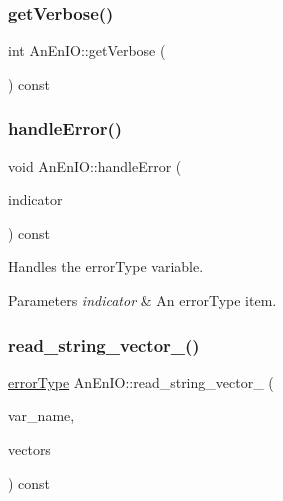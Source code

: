 \mbox{\label{class_an_en_i_o_a0bf0dab5e393c5597f97ab38c910e24d}} 
\subsubsection{\texorpdfstring{get\+Verbose()}{getVerbose()}}
{\footnotesize\ttfamily int An\+En\+I\+O\+::get\+Verbose (\begin{DoxyParamCaption}{ }\end{DoxyParamCaption}) const}

\mbox{\label{class_an_en_i_o_a92276aeba9c0b5bd1cd3d285271d505f}} 
\subsubsection{\texorpdfstring{handle\+Error()}{handleError()}}
{\footnotesize\ttfamily void An\+En\+I\+O\+::handle\+Error (\begin{DoxyParamCaption}\item[{const \mbox{\hyperlink{class_an_en_i_o_aa56bc1ec6610b86db4349bce20f9ead0}{error\+Type}} \&}]{indicator }\end{DoxyParamCaption}) const}

Handles the error\+Type variable.


\begin{DoxyParams}{Parameters}
{\em indicator} & An error\+Type item. \\
\hline
\end{DoxyParams}
\mbox{\label{class_an_en_i_o_a17e7a4c520675c23b01cbd65c7ffe1d5}} 
\subsubsection{\texorpdfstring{read\+\_\+string\+\_\+vector\+\_\+()}{read\_string\_vector\_()}}
{\footnotesize\ttfamily \mbox{\hyperlink{class_an_en_i_o_aa56bc1ec6610b86db4349bce20f9ead0}{error\+Type}} An\+En\+I\+O\+::read\+\_\+string\+\_\+vector\+\_\+ (\begin{DoxyParamCaption}\item[{std\+::string}]{var\+\_\+name,  }\item[{std\+::vector$<$ std\+::string $>$ \&}]{vectors }\end{DoxyParamCaption}) const\hspace{0.3cm}{\ttfamily [protected]}}

